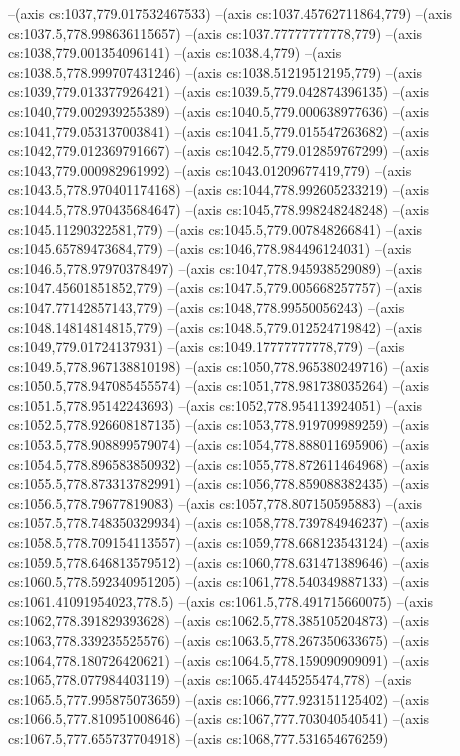 --(axis cs:1037,779.017532467533)
--(axis cs:1037.45762711864,779)
--(axis cs:1037.5,778.998636115657)
--(axis cs:1037.77777777778,779)
--(axis cs:1038,779.001354096141)
--(axis cs:1038.4,779)
--(axis cs:1038.5,778.999707431246)
--(axis cs:1038.51219512195,779)
--(axis cs:1039,779.013377926421)
--(axis cs:1039.5,779.042874396135)
--(axis cs:1040,779.002939255389)
--(axis cs:1040.5,779.000638977636)
--(axis cs:1041,779.053137003841)
--(axis cs:1041.5,779.015547263682)
--(axis cs:1042,779.012369791667)
--(axis cs:1042.5,779.012859767299)
--(axis cs:1043,779.000982961992)
--(axis cs:1043.01209677419,779)
--(axis cs:1043.5,778.970401174168)
--(axis cs:1044,778.992605233219)
--(axis cs:1044.5,778.970435684647)
--(axis cs:1045,778.998248248248)
--(axis cs:1045.11290322581,779)
--(axis cs:1045.5,779.007848266841)
--(axis cs:1045.65789473684,779)
--(axis cs:1046,778.984496124031)
--(axis cs:1046.5,778.97970378497)
--(axis cs:1047,778.945938529089)
--(axis cs:1047.45601851852,779)
--(axis cs:1047.5,779.005668257757)
--(axis cs:1047.77142857143,779)
--(axis cs:1048,778.99550056243)
--(axis cs:1048.14814814815,779)
--(axis cs:1048.5,779.012524719842)
--(axis cs:1049,779.01724137931)
--(axis cs:1049.17777777778,779)
--(axis cs:1049.5,778.967138810198)
--(axis cs:1050,778.965380249716)
--(axis cs:1050.5,778.947085455574)
--(axis cs:1051,778.981738035264)
--(axis cs:1051.5,778.95142243693)
--(axis cs:1052,778.954113924051)
--(axis cs:1052.5,778.926608187135)
--(axis cs:1053,778.919709989259)
--(axis cs:1053.5,778.908899579074)
--(axis cs:1054,778.888011695906)
--(axis cs:1054.5,778.896583850932)
--(axis cs:1055,778.872611464968)
--(axis cs:1055.5,778.873313782991)
--(axis cs:1056,778.859088382435)
--(axis cs:1056.5,778.79677819083)
--(axis cs:1057,778.807150595883)
--(axis cs:1057.5,778.748350329934)
--(axis cs:1058,778.739784946237)
--(axis cs:1058.5,778.709154113557)
--(axis cs:1059,778.668123543124)
--(axis cs:1059.5,778.646813579512)
--(axis cs:1060,778.631471389646)
--(axis cs:1060.5,778.592340951205)
--(axis cs:1061,778.540349887133)
--(axis cs:1061.41091954023,778.5)
--(axis cs:1061.5,778.491715660075)
--(axis cs:1062,778.391829393628)
--(axis cs:1062.5,778.385105204873)
--(axis cs:1063,778.339235525576)
--(axis cs:1063.5,778.267350633675)
--(axis cs:1064,778.180726420621)
--(axis cs:1064.5,778.159090909091)
--(axis cs:1065,778.077984403119)
--(axis cs:1065.47445255474,778)
--(axis cs:1065.5,777.995875073659)
--(axis cs:1066,777.923151125402)
--(axis cs:1066.5,777.810951008646)
--(axis cs:1067,777.703040540541)
--(axis cs:1067.5,777.655737704918)
--(axis cs:1068,777.531654676259)
